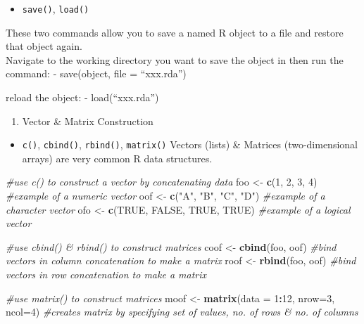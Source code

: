 \documentclass[]{book}
\newenvironment{Shaded}{\begin{snugshade}}{\end{snugshade}}
\newcommand{\CommentTok}[1]{\textcolor[rgb]{0.56,0.35,0.01}{\textit{#1}}}
\newcommand{\DataTypeTok}[1]{\textcolor[rgb]{0.13,0.29,0.53}{#1}}
\newcommand{\DecValTok}[1]{\textcolor[rgb]{0.00,0.00,0.81}{#1}}
\newcommand{\KeywordTok}[1]{\textcolor[rgb]{0.13,0.29,0.53}{\textbf{#1}}}
\newcommand{\NormalTok}[1]{#1}
\newcommand{\OperatorTok}[1]{\textcolor[rgb]{0.81,0.36,0.00}{\textbf{#1}}}
\newcommand{\OtherTok}[1]{\textcolor[rgb]{0.56,0.35,0.01}{#1}}
\newcommand{\StringTok}[1]{\textcolor[rgb]{0.31,0.60,0.02}{#1}}
\providecommand{\tightlist}{%
  \setlength{\itemsep}{0pt}\setlength{\parskip}{0pt}}
\begin{document}
\begin{itemize}
\tightlist
\item
  \texttt{save()}, \texttt{load()}
\end{itemize}

These two commands allow you to save a named R object to a file and restore that object again.\\
Navigate to the working directory you want to save the object in then run the command:
- save(object, file = ``xxx.rda'')

reload the object:
- load(``xxx.rda'')

\begin{enumerate}
\def\labelenumi{\arabic{enumi}.}
\setcounter{enumi}{8}
\tightlist
\item
  Vector \& Matrix Construction
\end{enumerate}

\begin{itemize}
\tightlist
\item
  \texttt{c()}, \texttt{cbind()}, \texttt{rbind()}, \texttt{matrix()}
  Vectors (lists) \& Matrices (two-dimensional arrays) are very common R data structures.
\end{itemize}

\begin{Shaded}
\begin{Highlighting}[]
\CommentTok{#use c() to construct a vector by concatenating data}
\NormalTok{foo <-}\StringTok{ }\KeywordTok{c}\NormalTok{(}\DecValTok{1}\NormalTok{, }\DecValTok{2}\NormalTok{, }\DecValTok{3}\NormalTok{, }\DecValTok{4}\NormalTok{) }\CommentTok{#example of a numeric vector}
\NormalTok{oof <-}\StringTok{ }\KeywordTok{c}\NormalTok{(}\StringTok{"A"}\NormalTok{, }\StringTok{"B"}\NormalTok{, }\StringTok{"C"}\NormalTok{, }\StringTok{"D"}\NormalTok{) }\CommentTok{#example of a character vector}
\NormalTok{ofo <-}\StringTok{ }\KeywordTok{c}\NormalTok{(}\OtherTok{TRUE}\NormalTok{, }\OtherTok{FALSE}\NormalTok{, }\OtherTok{TRUE}\NormalTok{, }\OtherTok{TRUE}\NormalTok{) }\CommentTok{#example of a logical vector}

\CommentTok{#use cbind() & rbind() to construct matrices}
\NormalTok{coof <-}\StringTok{ }\KeywordTok{cbind}\NormalTok{(foo, oof) }\CommentTok{#bind vectors in column concatenation to make a matrix}
\NormalTok{roof <-}\StringTok{ }\KeywordTok{rbind}\NormalTok{(foo, oof) }\CommentTok{#bind vectors in row concatenation to make a matrix}

\CommentTok{#use matrix() to construct matrices}
\NormalTok{moof <-}\StringTok{ }\KeywordTok{matrix}\NormalTok{(}\DataTypeTok{data =} \DecValTok{1}\OperatorTok{:}\DecValTok{12}\NormalTok{, }\DataTypeTok{nrow=}\DecValTok{3}\NormalTok{, }\DataTypeTok{ncol=}\DecValTok{4}\NormalTok{) }\CommentTok{#creates matrix by specifying set of values, no. of rows & no. of columns}
\end{Highlighting}
\end{Shaded}
\end{document}
